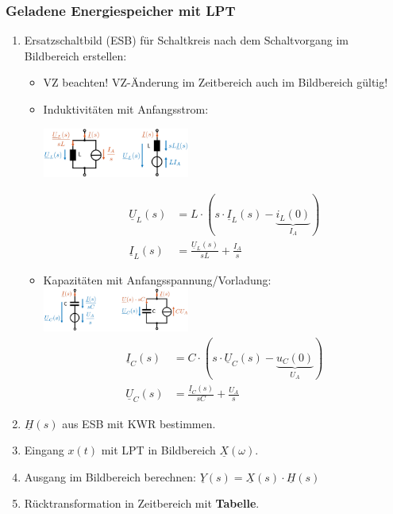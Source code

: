 \subsubsection{Geladene Energiespeicher mit LPT}
\begin{enumerate}
    \item Ersatzschaltbild (ESB) für Schaltkreis nach dem
        Schaltvorgang im Bildbereich erstellen:
        \begin{itemize}
        	\item VZ beachten! VZ-Änderung im Zeitbereich auch im Bildbereich gültig!
            \item Induktivitäten mit Anfangsstrom:
            
                \includegraphics[width=0.4\textwidth]{Bilder/ESB_Fuer_stromfuehrende_Induktivitaet}
                
                \begin{align*}
                    \underline{U}_L(s) &= L\cdot(s\cdot\underline{I}_L(s)-\underbrace{i_L(0)}_{I_A})\\
                    \underline{I}_L(s) &= \frac{\underline{U}_L(s)}{sL}+\frac{I_A}{s}
                \end{align*}
            \item Kapazitäten mit Anfangsspannung/Vorladung:
                \includegraphics[width=0.4\textwidth]{Bilder/ESB_Fuer_geladene_Kapazitaet}
                \begin{align*}
                    \underline{I}_C(s) &= C\cdot(s\cdot\underline{U}_C(s)-\underbrace{u_C(0)}_{U_A})\\
                    \underline{U}_C(s) &= \frac{\underline{I}_C(s)}{sC}+\frac{U_A}{s}
                \end{align*}
        \end{itemize}
    \item $\underline{H}(s)$ aus ESB mit KWR bestimmen.
    \item Eingang $x(t)$ mit LPT in Bildbereich $\underline{X}(\omega)$.
    \item Ausgang im Bildbereich berechnen: $\underline{Y}(s) =
        \underline{X}(s)\cdot \underline{H}(s)$
    \item Rücktransformation in Zeitbereich mit \textbf{Tabelle}.
\end{enumerate}

